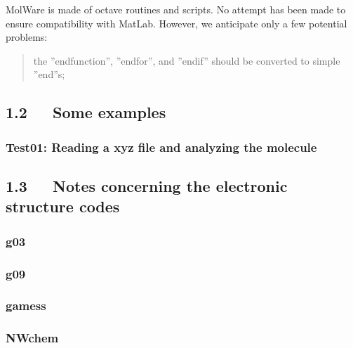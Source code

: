 \documentclass[a4paper]{article}
\begin{document}
MolWare is made of octave routines and scripts. No attempt has been made
to ensure compatibility with MatLab. However, we anticipate only a few
potential problems:
%
\begin{quote}
\begin{list}{()}
{
\setlength{\rightmargin}{\leftmargin}
}

\item the ''endfunction'', ''endfor'', and ''endif'' should be converted
to simple ''end''s;
\end{list}

\end{quote}


\subsection{1.2~~~Some examples%
  \label{some-examples}%
}


\subsubsection{Test01: Reading a xyz file and analyzing the molecule%
  \label{test01-reading-a-xyz-file-and-analyzing-the-molecule}%
}


\subsection{1.3~~~Notes concerning the electronic structure codes%
  \label{notes-concerning-the-electronic-structure-codes}%
}


\subsubsection{g03%
  \label{g03}%
}


\subsubsection{g09%
  \label{g09}%
}


\subsubsection{gamess%
  \label{gamess}%
}


\subsubsection{NWchem%
  \label{nwchem}%
}
\end{document}
